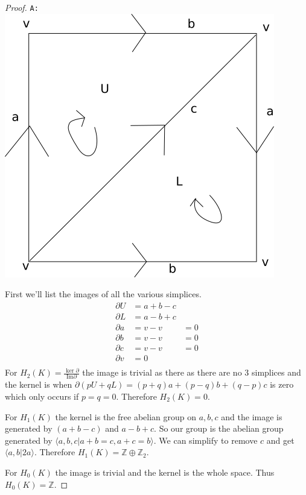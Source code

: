 \documentclass[10pt]{article}
\newcommand{\sk}{\vskip 10mm}
\newcommand{\bb}[1]{\mathbb{#1}}
\theoremstyle{plain}
\theoremstyle{remark}
\begin{document}
\begin{proof}
  \verb|A:|
  \includegraphics[scale=.5]{klein}

  First we'll list the images of all the various simplices.
  \begin{align*}
    \partial U &= a+b-c\\
    \partial L &= a-b+c\\
    \partial a &= v-v&=0\\
    \partial b &= v-v&=0\\
    \partial c &= v-v&=0\\
    \partial v &= 0\\
  \end{align*}
  For $H_2(K)=\frac{\ker \partial}{\text{Im} \partial}$ the image is trivial as there as
  there are no 3 simplices and the kernel is when $\partial(pU+qL)=(p+q)a+(p-q)b+(q-p)c$
  is zero which only occurs if $p=q=0$. Therefore $H_2(K)=0$.

  For $H_1(K)$ the kernel is the free abelian group on $a,b,c$ and the image
  is generated by $(a+b-c)$ and $a-b+c$. So our group is the abelian group
  generated by $\langle a,b,c|a+b=c,a+c=b\rangle$. We can simplify to remove $c$ and
  get $\langle a,b|2a\rangle$. Therefore $H_1(K)=\bb{Z}\oplus\bb{Z}_2$.

  For $H_0(K)$ the image is trivial and the kernel is the whole space. Thus
  $H_0(K)=\bb{Z}$.
\end{proof}

\sk
\end{document}
